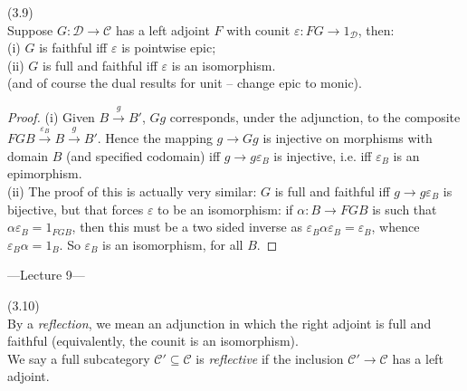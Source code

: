 \documentclass[a4paper]{article}
\begin{document}
\begin{lemma} (3.9)\\
    Suppose $G:\mathcal{D} \to \mathcal{C}$ has a left adjoint $F$ with counit $\varepsilon:FG \to 1_{\mathcal{D}}$, then:\\
    (i) $G$ is faithful iff $\varepsilon$ is pointwise epic;\\
    (ii) $G$ is full and faithful iff $\varepsilon$ is an isomorphism.\\
    (and of course the dual results for unit -- change epic to monic).\\
    \begin{proof}
        (i) Given $B \xrightarrow{g} B'$, $Gg$ corresponds, under the adjunction, to the composite $FGB \xrightarrow{\varepsilon_B} B \xrightarrow{g} B'$. Hence the mapping $g \to Gg$ is injective on morphisms with domain $B$ (and specified codomain) iff $g \to g\varepsilon_B$ is injective, i.e. iff $\varepsilon_B$ is an epimorphism.\\
        (ii) The proof of this is actually very similar: $G$ is full and faithful iff $g \to g\varepsilon_B$ is bijective, but that forces $\varepsilon$ to be an isomorphism: if $\alpha:B \to FGB$ is such that $\alpha\varepsilon_B = 1_{FGB}$, then this must be a two sided inverse as $\varepsilon_B \alpha \varepsilon_B = \varepsilon_B$, whence $\varepsilon_B \alpha = 1_B$. So $\varepsilon_B$ is an isomorphism, for all $B$.
    \end{proof}
\end{lemma}

---Lecture 9---

\begin{defi} (3.10)\\
    By a \emph{reflection}, we mean an adjunction in which the right adjoint is full and faithful (equivalently, the counit is an isomorphism).\\
    We say a full subcategory $\mathcal{C}' \subseteq \mathcal{C}$ is \emph{reflective} if the inclusion $\mathcal{C}'\to\mathcal{C}$ has a left adjoint.
\end{defi}
\end{document}

